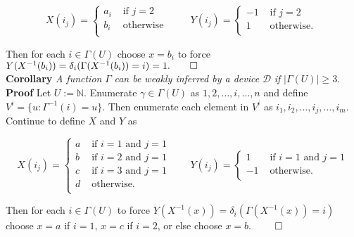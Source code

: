 \documentclass[11pt]{article}
\newcommand{\N}{\mathbb{N}}
\begin{document}
\begin{equation*}
X(i_j) = \begin{cases}
       a_i & \text{ if } j = 2 \\
       b_i & \text{ otherwise } \\
       \end{cases} \quad \quad 
Y(i_j) = \begin{cases}
       -1 & \text{ if } j = 2 \\
       1 & \text{ otherwise. } \\
       \end{cases} 
\end{equation*}

Then for each $ i \in \Gamma(U) $ choose $ x = b_i $ to force $ Y(X^{-1}(b_i)) = \delta_{i}(\Gamma(X^{-1}(b_i)) = i) = 1. \hfill \qed $ \\

\bigskip   
\textbf{Corollary} \; \textit{A function} $ \Gamma $ \textit{can be weakly inferred by a device} $ \mathcal{D} $ \textit{if} $ |\Gamma(U)| \geq 3 $.  \\
\textbf{Proof} \; Let $ U := \N $. Enumerate $ \gamma \in \Gamma(U) $ as $ 1, 2, \dots, i, \dots, n $ and define $ V^{i} = \{u: \Gamma^{-1}(i) = u \} $. Then enumerate each element in $ V^i $ as $ i_1, i_2, \dots, i_j, \dots, i_m $. Continue to define $ X $ and $ Y $ as 

\begin{equation*}
X(i_j) = \begin{cases}
       a & \text{ if } i = 1 \text{ and } j = 1 \\
       b & \text{ if } i = 2 \text{ and } j = 1 \\
       c & \text{ if } i = 3 \text{ and } j = 1 \\
       d & \text{ otherwise. } \\
       \end{cases} \quad \quad 
Y(i_j) = \begin{cases}
       1 & \text{ if } i = 1 \text{ and } j = 1 \\
       -1 & \text{ otherwise. } \\
       \end{cases} 
\end{equation*}

Then for each $ i \in \Gamma(U) $ to force $ Y(X^{-1}(x)) = \delta_{i}(\Gamma(X^{-1}(x)) = i) $ choose $ x = a $ if $ i = 1 $, $ x = c $ if $ i = 2 $, or else choose $ x = b $. $ \hfill \qed $ \\
\end{document}
